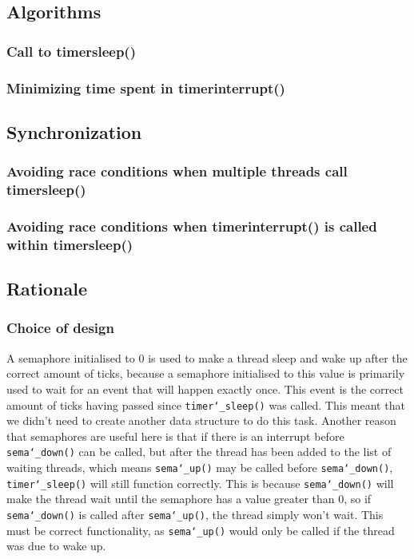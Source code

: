 \documentclass{article}
\renewcommand{\_}{\char`_}
\begin{document}
\subsection{Algorithms}
\subsubsection{Call to timer\textunderscore sleep()}
\subsubsection{Minimizing time spent in timer\textunderscore interrupt()}
\subsection{Synchronization}
\subsubsection{Avoiding race conditions when multiple threads call timer\textunderscore sleep()}
\subsubsection{Avoiding race conditions when timer\textunderscore interrupt() is called within timer\textunderscore sleep()}
\subsection{Rationale}

\subsubsection{Choice of design}

A semaphore initialised to 0 is used to make a thread sleep and wake up after the correct amount of ticks, because a semaphore initialised to this value is primarily used to wait for an event that will happen exactly once. This event is the correct amount of ticks having passed since \texttt{timer\_sleep()} was called. This meant that we didn't need to create another data structure to do this task. Another reason that semaphores are useful here is that if there is an interrupt before \texttt{sema\_down()} can be called, but after the thread has been added to the list of waiting threads, which means \texttt{sema\_up()} may be called before \texttt{sema\_down()}, \texttt{timer\_sleep()} will still function correctly. This is because \texttt{sema\_down()} will make the thread wait until the semaphore has a value greater than 0, so if \texttt{sema\_down()} is called after \texttt{sema\_up()}, the thread simply won't wait. This must be correct functionality, as \texttt{sema\_up()} would only be called if the thread was due to wake up.
\end{document}
